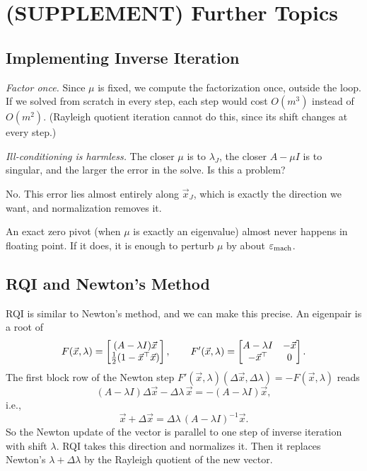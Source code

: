 \clearpage
\section{(SUPPLEMENT) Further Topics}
\subsection{Implementing Inverse Iteration}
\label{sec:impl-inverse}

\emph{Factor once.} Since $\mu$ is fixed, we compute the factorization once, outside the loop. If we solved from scratch in every step, each step would cost $O(m^3)$ instead of $O(m^2)$. (Rayleigh quotient iteration cannot do this, since its shift changes at every step.)

\emph{Ill-conditioning is harmless.} The closer $\mu$ is to $\lambda_J$, the closer $A - \mu I$ is to singular, and the larger the error in the solve. Is this a problem?

No. This error lies almost entirely along $\vec{x}_J$, which is exactly the direction we want, and normalization removes it.

An exact zero pivot (when $\mu$ is exactly an eigenvalue) almost never happens in floating point. If it does, it is enough to perturb $\mu$ by about $\varepsilon_{\mathrm{mach}}$.

\subsection{RQI and Newton's Method}

RQI is similar to Newton's method, and we can make this precise. An eigenpair is a root of
\begin{equation}
  F(\vec{x}, \lambda) = \begin{bmatrix} (A - \lambda I)\vec{x} \\ \tfrac{1}{2}(1 - \vec{x}^\top\vec{x}) \end{bmatrix}, \qquad
  F'(\vec{x}, \lambda) = \begin{bmatrix} A - \lambda I & -\vec{x} \\ -\vec{x}^\top & 0 \end{bmatrix}.
\end{equation}
The first block row of the Newton step $F'(\vec{x}, \lambda)(\Delta\vec{x}, \Delta\lambda) = -F(\vec{x}, \lambda)$ reads
\begin{equation*}
  (A - \lambda I)\Delta\vec{x} - \Delta\lambda\,\vec{x} = -(A - \lambda I)\vec{x},
\end{equation*}
i.e.,
\begin{equation}
  \vec{x} + \Delta\vec{x} = \Delta\lambda\,(A - \lambda I)^{-1}\vec{x}.
\end{equation}
So the Newton update of the vector is parallel to one step of inverse iteration with shift $\lambda$. RQI takes this direction and normalizes it. Then it replaces Newton's $\lambda + \Delta\lambda$ by the Rayleigh quotient of the new vector.

